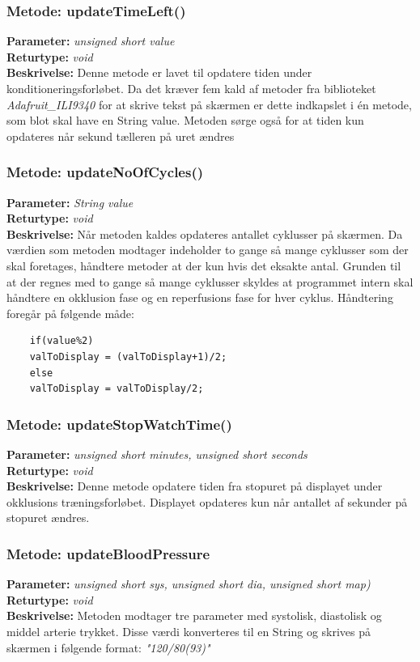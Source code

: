 \subsubsection{Metode: updateTimeLeft()}
\textbf{Parameter: } \textit{unsigned short value}
\\ \textbf{Returtype: } \textit{void}
\\ \textbf{Beskrivelse: } Denne metode er lavet til opdatere tiden under konditioneringsforløbet. Da det kræver fem kald af metoder fra biblioteket \textit{Adafruit\_ILI9340} for at skrive tekst på skærmen er dette indkapslet i én metode, som blot skal have en String value. Metoden sørge også for at tiden kun opdateres når sekund tælleren på uret ændres

\subsubsection{Metode: updateNoOfCycles()}
\textbf{Parameter: } \textit{String value}
\\ \textbf{Returtype: } \textit{void}
\\ \textbf{Beskrivelse: } Når metoden kaldes opdateres antallet cyklusser på skærmen. Da værdien som metoden modtager indeholder to gange så mange cyklusser som der skal foretages, håndtere metoder at der kun hvis det eksakte antal. Grunden til at der regnes med to gange så mange cyklusser skyldes at programmet intern skal håndtere en okklusion fase og en reperfusions fase for hver cyklus. Håndtering foregår på følgende måde: 

\begin{lstlisting}
	if(value%2)
	valToDisplay = (valToDisplay+1)/2;
	else
	valToDisplay = valToDisplay/2;
\end{lstlisting}

\subsubsection{Metode: updateStopWatchTime()}
\textbf{Parameter: } \textit{unsigned short minutes, unsigned short seconds}
\\ \textbf{Returtype: } \textit{void}
\\ \textbf{Beskrivelse: } Denne metode opdatere tiden fra stopuret på displayet under okklusions træningsforløbet. Displayet opdateres kun når antallet af sekunder på stopuret ændres. 

\subsubsection{Metode: updateBloodPressure}
\textbf{Parameter: } \textit{unsigned short sys, unsigned short dia, unsigned short map)} 
\\ \textbf{Returtype: } \textit{void}
\\ \textbf{Beskrivelse: } Metoden modtager tre parameter med systolisk, diastolisk og middel arterie trykket. Disse værdi konverteres til en String og skrives på skærmen i følgende format: \textit{"120/80(93)"}

